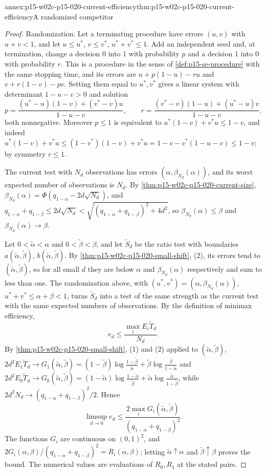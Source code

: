 \begin{annexitem}{annex:p15-w02c-p15-020-current-efficiency}{thm:p15-w02c-p15-020-current-efficiency}{A randomized competitor}
\begin{proof}
Randomization. Let a terminating procedure have errors \((u,v)\) with
\(u+v<1\), and let \(u\leq u^*\), \(v\leq v^*\), \(u^*+v^*\leq1\). Add
an independent seed and, at termination, change a decision \(0\) into
\(1\) with probability \(p\) and a decision \(1\) into \(0\) with
probability \(r\). This is a procedure in the sense of
\cref{def:p15-se-procedure} with the same stopping time, and its errors
are \(u+p(1-u)-ru\) and \(v+r(1-v)-pv\). Setting them equal to
\(u^*,v^*\) gives a linear system with determinant \(1-u-v>0\) and
solution
\[
 p=\frac{(u^*-u)(1-v)+(v^*-v)u}{1-u-v},\qquad
 r=\frac{(v^*-v)(1-u)+(u^*-u)v}{1-u-v},
\]
both nonnegative. Moreover \(p\leq1\) is equivalent to
\(u^*(1-v)+v^*u\leq1-v\), and indeed
\(u^*(1-v)+v^*u\leq(1-v^*)(1-v)+v^*u=1-v-v^*(1-u-v)\leq1-v\); by
symmetry \(r\leq1\).

The current test with \(N_d\) observations has errors
\((\alpha,\beta_{N_d}(\alpha))\), and its worst expected number of
observations is \(N_d\). By \cref{thm:p15-w02c-p15-020-current-size},
\(\beta_{N_d}(\alpha)=\Phi(q_{1-\alpha}-2d\sqrt{N_d})\), and
\(q_{1-\alpha}+q_{1-\beta}\leq2d\sqrt{N_d}<\sqrt{(q_{1-\alpha}+q_{1-\beta})^2+4d^2}\),
so \(\beta_{N_d}(\alpha)\leq\beta\) and \(\beta_{N_d}(\alpha)\to\beta\).

Let \(0<\tilde\alpha<\alpha\) and \(0<\tilde\beta<\beta\), and let
\(\tilde S_d\) be the ratio test with boundaries
\(a(\tilde\alpha,\tilde\beta)\), \(b(\tilde\alpha,\tilde\beta)\). By
\cref{thm:p15-w02c-p15-020-small-shift}, (2), its errors tend to
\((\tilde\alpha,\tilde\beta)\), so for all small \(d\) they are below
\(\alpha\) and \(\beta_{N_d}(\alpha)\) respectively and sum to less than
one. The randomization above, with
\((u^*,v^*)=(\alpha,\beta_{N_d}(\alpha))\), \(u^*+v^*\leq\alpha+\beta<1\),
turns \(\tilde S_d\) into a test of the same strength as the current
test with the same expected numbers of observations. By the definition
of minimax efficiency,
\[
 e_d\leq\frac{\max_iE_i\tilde T_d}{N_d}.
\]
By \cref{thm:p15-w02c-p15-020-small-shift}, (1) and (2) applied to
\((\tilde\alpha,\tilde\beta)\), \(2d^2E_1\tilde T_d\to G_1(\tilde\alpha,\tilde\beta)
=(1-\tilde\beta)\log\frac{1-\tilde\beta}{\tilde\alpha}+\tilde\beta\log\frac{\tilde\beta}{1-\tilde\alpha}\)
and \(2d^2E_0\tilde T_d\to G_0(\tilde\alpha,\tilde\beta)
=(1-\tilde\alpha)\log\frac{1-\tilde\alpha}{\tilde\beta}+\tilde\alpha\log\frac{\tilde\alpha}{1-\tilde\beta}\),
while \(2d^2N_d\to(q_{1-\alpha}+q_{1-\beta})^2/2\). Hence
\[
 \limsup_{d\to0}e_d\leq\frac{2\max_iG_i(\tilde\alpha,\tilde\beta)}{(q_{1-\alpha}+q_{1-\beta})^2}.
\]
The functions \(G_i\) are continuous on \((0,1)^2\), and
\(2G_i(\alpha,\beta)/(q_{1-\alpha}+q_{1-\beta})^2=R_i(\alpha,\beta)\);
letting \(\tilde\alpha\uparrow\alpha\) and \(\tilde\beta\uparrow\beta\)
proves the bound. The numerical values are evaluations of
\(R_0,R_1\) at the stated pairs.
\end{proof}
\end{annexitem}

